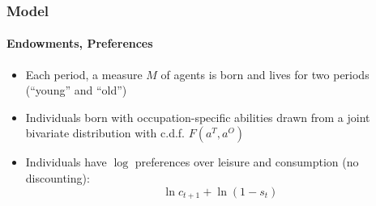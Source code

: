 \documentclass[11pt]{beamer}
\begin{document}

\begin{frame}

\end{frame}

\begin{frame}
\frametitle{Model}
\framesubtitle{Endowments, Preferences}
\begin{itemize}
  \item Each period, a measure $M$ of agents is born and lives for two periods (``young'' and ``old'')
  \item Individuals born with occupation-specific abilities drawn from a joint bivariate distribution with c.d.f. $F(a^T,a^O)$
  \item Individuals have $\log$ preferences over leisure and consumption (no discounting):
  \begin{displaymath}
\ln c_{t+1} + \ln\left(1-s_t\right)
\end{displaymath}
\end{itemize}
\end{frame}
\end{document}
